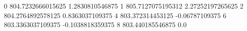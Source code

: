 0 804.7232666015625 1.2830810546875
1 805.7127075195312 2.27252197265625
2 804.2764892578125 0.8363037109375
4 803.372314453125 -0.06787109375
6 803.3363037109375 -0.1038818359375
8 803.440185546875 0.0
